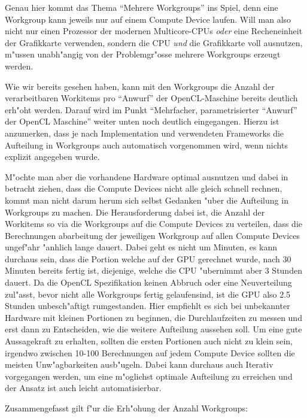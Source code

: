 \begin{refsection}
Genau hier kommt das Thema ``Mehrere Workgroups'' ins Spiel, denn
eine Workgroup kann jeweils nur auf einem Compute Device laufen. Will man also
nicht nur einen Prozessor der modernen Multicore-CPUs \textit{oder}
eine Recheneinheit der Grafikkarte verwenden, sondern die CPU \textit{und} 
die Grafikkarte voll ausnutzen, m"ussen unabh"angig
von der Problemgr"osse mehrere Workgroups erzeugt werden.

Wie wir bereits gesehen haben, kann mit den Workgroups die Anzahl der 
verarbeitbaren Workitems  pro ``Anwurf'' der OpenCL-Maschine bereits
deutlich erh"oht werden. Darauf wird im Punkt ``Mehrfacher, parametrisierter
``Anwurf'' der OpenCL Maschine'' weiter unten noch deutlich eingegangen. 
Hierzu ist anzumerken, dass je nach Implementation und 
verwendeten Frameworks die Aufteilung in Workgroups auch automatisch
vorgenommen wird, wenn nichts explizit angegeben wurde.

M"ochte man aber die vorhandene Hardware optimal ausnutzen und dabei
in betracht ziehen, dass die Compute Devices nicht alle gleich schnell
rechnen, kommt man nicht darum herum sich selbst Gedanken "uber die
Aufteilung in Workgroups zu machen. Die Herausforderung dabei ist, 
die Anzahl der Workitems so via die Workgroups auf die Compute Devices
zu verteilen, dass die Berechnungen abarbeitung der jeweiligen Workgroup
auf allen Compute Devices ungef"ahr "anhlich lange dauert. Dabei geht es 
nicht um Minuten, es kann durchaus sein, dass 
die Portion welche auf der GPU gerechnet wurde, nach 30 Minuten bereits
fertig ist, diejenige, welche die CPU "ubernimmt aber 3 Stunden dauert.
Da die OpenCL Spezifikation keinen Abbruch oder eine Neuverteilung zul"asst,
bevor nicht alle Workgroups fertig gelaufensind, ist die GPU also 2.5 Stunden 
unbesch"aftigt rumgestanden. Hier empfiehlt es sich bei unbekannter Hardware 
mit kleinen Portionen zu beginnen, die Durchlaufzeiten zu messen und erst dann 
zu Entscheiden, wie die weitere Aufteilung aussehen soll. Um eine gute 
Aussagekraft zu erhalten, sollten die ersten Portionen auch nicht zu klein sein,
irgendwo zwischen 10-100 Berechnungen auf jedem Compute Device sollten die meisten 
Unw"agbarkeiten ausb"ugeln. Dabei kann durchaus auch Iterativ vorgegangen 
werden, um eine m"oglichst optimale Aufteilung zu erreichen und der Ansatz ist
auch leicht automatisierbar.

Zusammengefasst gilt f"ur die Erh"ohung der Anzahl Workgroups:


\end{refsection}
